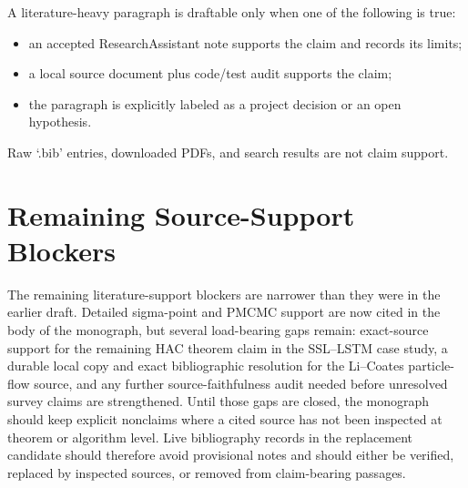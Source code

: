 A literature-heavy paragraph is draftable only when one of the following is
true:
\begin{itemize}
  \item an accepted ResearchAssistant note supports the claim and records its
    limits;
  \item a local source document plus code/test audit supports the claim;
  \item the paragraph is explicitly labeled as a project decision or an open
    hypothesis.
\end{itemize}
Raw `.bib' entries, downloaded PDFs, and search results are not claim support.

\section{Remaining Source-Support Blockers}
\label{sec:bf-ra-current-blockers}

The remaining literature-support blockers are narrower than they were in the earlier draft. Detailed sigma-point and PMCMC support are now cited in the body of the monograph, but several load-bearing gaps remain: exact-source support for the remaining HAC theorem claim in the SSL--LSTM case study, a durable local copy and exact bibliographic resolution for the Li--Coates particle-flow source, and any further source-faithfulness audit needed before unresolved survey claims are strengthened. Until those gaps are closed, the monograph should keep explicit nonclaims where a cited source has not been inspected at theorem or algorithm level. Live bibliography records in the replacement candidate should therefore avoid provisional notes and should either be verified, replaced by inspected sources, or removed from claim-bearing passages.
